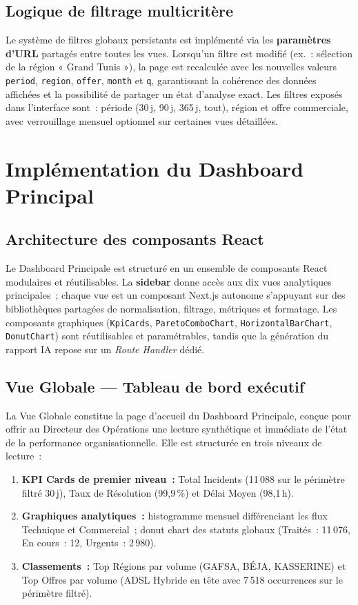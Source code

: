\documentclass[10pt,a4paper]{report}
\begin{document}
\subsection{Logique de filtrage multicritère}

Le système de filtres globaux persistants est implémenté via les \textbf{paramètres d'URL} partagés entre toutes les vues. Lorsqu'un filtre est modifié (ex.~: sélection de la région « Grand Tunis »), la page est recalculée avec les nouvelles valeurs \texttt{period}, \texttt{region}, \texttt{offer}, \texttt{month} et \texttt{q}, garantissant la cohérence des données affichées et la possibilité de partager un état d'analyse exact. Les filtres exposés dans l'interface sont~: période (30\,j, 90\,j, 365\,j, tout), région et offre commerciale, avec verrouillage mensuel optionnel sur certaines vues détaillées.

\section{Implémentation du Dashboard Principal}

\subsection{Architecture des composants React}

Le Dashboard Principale est structuré en un ensemble de composants React modulaires et réutilisables. La \textbf{sidebar} donne accès aux dix vues analytiques principales~; chaque vue est un composant Next.js autonome s'appuyant sur des bibliothèques partagées de normalisation, filtrage, métriques et formatage. Les composants graphiques (\texttt{KpiCards}, \texttt{ParetoComboChart}, \texttt{HorizontalBarChart}, \texttt{DonutChart}) sont réutilisables et paramétrables, tandis que la génération du rapport IA repose sur un \textit{Route Handler} dédié.

\subsection{Vue Globale --- Tableau de bord exécutif}

La Vue Globale constitue la page d'accueil du Dashboard Principale, conçue pour offrir au Directeur des Opérations une lecture synthétique et immédiate de l'état de la performance organisationnelle. Elle est structurée en trois niveaux de lecture~:

\begin{enumerate}[leftmargin=*, label=(\arabic*), itemsep=4pt]
  \item \textbf{KPI Cards de premier niveau~:} Total Incidents (11\,088 sur le périmètre filtré 30\,j), Taux de Résolution (99,9\,\%) et Délai Moyen (98,1\,h).
  \item \textbf{Graphiques analytiques~:} histogramme mensuel différenciant les flux Technique et Commercial~; donut chart des statuts globaux (Traités~: 11\,076, En cours~: 12, Urgents~: 2\,980).
  \item \textbf{Classements~:} Top Régions par volume (GAFSA, BÉJA, KASSERINE) et Top Offres par volume (ADSL Hybride en tête avec 7\,518 occurrences sur le périmètre filtré).
\end{enumerate}
\end{document}
